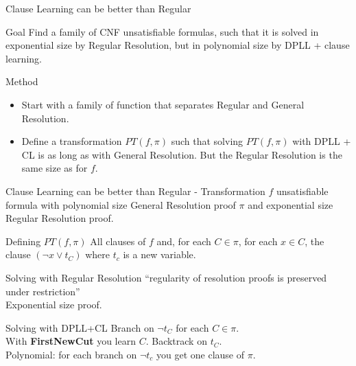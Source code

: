 \documentclass[page number]{beamer}
\begin{document}
\begin{frame}{Clause Learning can be better than Regular}
  \begin{exampleblock}{Goal}
    Find a family of CNF unsatisfiable formulas, such that it is solved in exponential size by Regular Resolution, but in polynomial size by DPLL + clause learning.
  \end{exampleblock}
  \vfill
  \begin{block}{Method}
    \begin{itemize}
    \item Start with a family of function that separates Regular and General Resolution.
    \item Define a transformation $PT(f,\pi)$ such that solving $PT(f,\pi)$ with DPLL + CL is as long as with General Resolution. But the Regular Resolution is the same size as for $f$.
    \end{itemize}
  \end{block}
      
\end{frame}

\begin{frame}{Clause Learning can be better than Regular - Transformation}
  $f$ unsatisfiable formula with polynomial size General Resolution proof $\pi$ and exponential size Regular Resolution proof.
  \vfill
  \begin{block}{Defining $PT(f,\pi)$}
    All clauses of $f$ and, for each $C\in \pi$, for each $x\in C$, the clause $(\neg x\vee t_C)$ where $t_c$ is a new variable.
  \end{block}
  \vfill
  \begin{alertblock}{Solving with Regular Resolution}
    ``regularity of resolution proofs is preserved under restriction''\\
    Exponential size proof.
  \end{alertblock}
  \vfill
  \begin{exampleblock}{Solving with DPLL+CL}
    Branch on $\neg t_C$ for each $C\in\pi$.\\
    With \textbf{FirstNewCut} you learn $C$. Backtrack on $t_C$.\\
    Polynomial: for each branch on $\neg t_c$ you get one clause of $\pi$.
  \end{exampleblock}
\end{frame}
\end{document}
